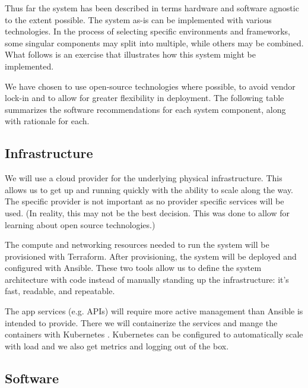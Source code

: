 \documentclass[12pt]{article}
\begin{document}
Thus far the system has been described in terms hardware and software agnostic to the extent possible. The system as-is can be implemented with various technologies. In the process of selecting specific environments and frameworks, some singular components may split into multiple, while others may be combined. What follows is an exercise that illustrates how this system might be implemented.

We have chosen to use open-source technologies where possible, to avoid vendor lock-in and to allow for greater flexibility in deployment. The following table summarizes the software recommendations for each system component, along with rationale for each.

\subsection{Infrastructure}
We will use a cloud provider for the underlying physical infrastructure. This allows us to get up and running quickly with the ability to scale along the way. The specific provider is not important as no provider specific services will be used. (In reality, this may not be the best decision. This was done to allow for learning about open source technologies.)

The compute and networking resources needed to run the system will be provisioned with Terraform. After provisioning, the system will be deployed and configured with Ansible. These two tools allow us to define the system architecture with code instead of manually standing up the infrastructure: it's fast, readable, and repeatable.

The app services (e.g. APIs) will require more active management than Ansible is intended to provide. There we will containerize the services and mange the containers with Kubernetes \cite{kubernetes}. Kubernetes can be configured to automatically scale with load and we also get metrics and logging out of the box.

\subsection{Software}
\end{document}
